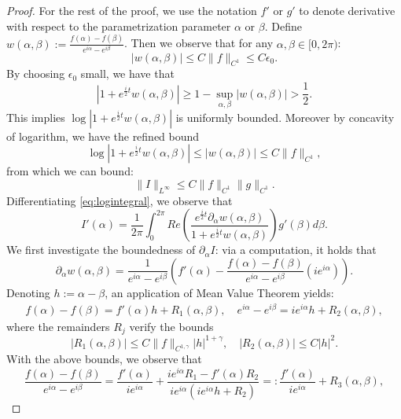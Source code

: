 \documentclass[10pt,a4paper]{amsart}
\newcommand{\eps}{\epsilon}
\newcommand{\p}{\partial}
\newcommand{\palpha}{\p_\alpha}
\begin{document}
\begin{proof}
    For the rest of the proof, we use the notation $f'$ or $g'$ to denote derivative with respect to the parametrization parameter $\alpha$ or $\beta$. 
    Define $w(\alpha,\beta) := \frac{f(\alpha) - f(\beta)}{e^{i\alpha} - e^{i\beta}}$. Then we observe that for any $\alpha,\beta \in [0,2\pi)$:
    $$
    |w(\alpha, \beta)| \le C\|f\|_{C^1} \le C\eps_0.
    $$
    By choosing $\eps_0$ small, we have that
    \begin{equation}\label{est:nondeg}
        |1+ e^{\frac{i}{2}t} w(\alpha,\beta)| \ge 1 - \sup_{\alpha,\beta}|w(\alpha,\beta)| > \frac12.
    \end{equation}
    This implies $\log|1+ e^{\frac{i}{2}t} w(\alpha,\beta)|$ is uniformly bounded. Moreover by concavity of logarithm, we have the refined bound
    $$
    \log |1+ e^{\frac{i}{2}t} w(\alpha,\beta)| \le |w(\alpha,\beta)| \le C\|f\|_{C^1},
    $$
    from which we can  bound:
    \begin{equation}
        \label{est:logintegralLinfty}
        \|I\|_{L^\infty} \le C\|f\|_{C^1}\|g\|_{C^1}.
    \end{equation}
    Differentiating \eqref{eq:logintegral}, we observe that
    \begin{equation}
        \label{eq:paI}
        I'(\alpha) = \frac{1}{2\pi}\int_0^{2\pi}Re\left(\frac{e^{\frac{i}{2}t} \palpha w(\alpha,\beta)}{1+ e^{\frac{i}{2}t} w(\alpha,\beta)}\right) g'(\beta) d\beta.
    \end{equation}
    We first investigate the boundedness of $\palpha I$: via a computation, it holds that
    \begin{equation}
        \label{paw}
        \palpha w(\alpha,\beta) = \frac{1}{e^{i\alpha} - e^{i\beta}}\left(f'(\alpha) - \frac{f(\alpha) - f(\beta)}{e^{i\alpha} - e^{i\beta}}(ie^{i\alpha})\right).
    \end{equation}
    Denoting $h := \alpha - \beta$, an application of Mean Value Theorem yields:
    \begin{align*}
        f(\alpha) - f(\beta) = f'(\alpha) h + R_1(\alpha,\beta),\quad e^{i\alpha} - e^{i\beta} = ie^{i\alpha}h + R_2(\alpha,\beta),
    \end{align*}
    where the remainders $R_{j}$ verify the bounds
    $$
    |R_1(\alpha,\beta)| \le C\|f\|_{C^{1,\gamma}}|h|^{1+\gamma},\quad |R_2(\alpha,\beta)| \le C |h|^2.
    $$
    With the above bounds, we observe that
    $$
    \frac{f(\alpha) - f(\beta)}{e^{i\alpha} - e^{i\beta}} = \frac{f'(\alpha)}{ie^{i\alpha}} + \frac{ie^{i\alpha}R_1 - f'(\alpha) R_2}{ie^{i\alpha}(ie^{i\alpha} h + R_2)}=: \frac{f'(\alpha)}{ie^{i\alpha}} + R_3(\alpha,\beta), 
$$
\end{proof}
\end{document}
